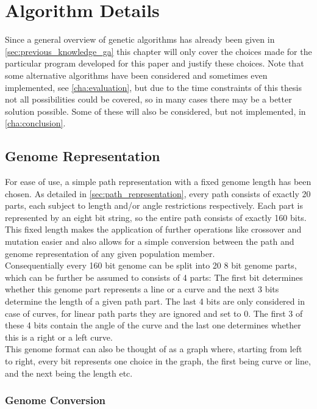 \chapter{Algorithm Details}
\label{cha:algorithm_details}

Since a general overview of genetic algorithms has already been given in \ref{sec:previous_knowledge_ga} this chapter will only cover the choices made for the particular program developed for this paper and justify these choices. Note that some alternative algorithms have been considered and sometimes even implemented, see \ref{cha:evaluation}, but due to the time constraints of this thesis not all possibilities could be covered, so in many cases there may be a better solution possible. Some of these will also be considered, but not implemented, in \ref{cha:conclusion}. 

\section{Genome Representation}
\label{sec:genome_representation}

For ease of use, a simple path representation with a fixed genome length has been chosen. As detailed in \ref{sec:path_representation}, every path consists of exactly 20 parts, each subject to length and/or angle restrictions respectively. Each part is represented by an eight bit string, so the entire path consists of exactly 160 bits. This fixed length makes the application of further operations like crossover and mutation easier and also allows for a simple conversion between the path and genome representation of any given population member. \\
Consequentially every 160 bit genome can be split into 20 8 bit genome parts, which can be further be assumed to consists of 4 parts: The first bit determines whether this genome part represents a line or a curve and the next 3 bits determine the length of a given path part. The last 4 bits are only considered in case of curves, for linear path parts they are ignored and set to 0. The first 3 of these 4 bits contain the angle of the curve and the last one determines whether this is a right or a left curve. \\
This genome format can also be thought of as a graph where, starting from left to right, every bit represents one choice in the graph, the first being curve or line, and the next being the length etc. 

\subsection{Genome Conversion}
\label{sec:genome_conversion}

